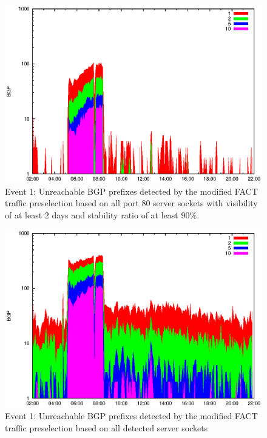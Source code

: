 \begin{figure}
	[p] \centering 
	\includegraphics[width=0.75\linewidth]{images/events/2010_03_25/bgp_log_port80_Set_stab_9_vts_2.eps} \caption{Event 1: Unreachable BGP prefixes detected by the modified FACT traffic preselection based on all port 80 server sockets with visibility of at least 2 days and stability ratio of at least $90\%$.} 
	\label{fig:AMS_IX_FACT_allSES80VTS2STAB9} 
\end{figure}
\begin{figure}
	[p] \centering 
	\includegraphics[width=0.75\linewidth]{images/events/2010_03_25/bgp_log_all_external.eps} \caption{Event 1: Unreachable BGP prefixes detected by the modified FACT traffic preselection based on all detected server sockets} 
	\label{fig:AMS_IX_FACT_allSES} 
\end{figure}
